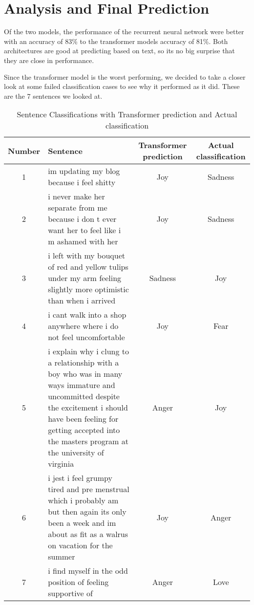 \section{Analysis and Final Prediction}
Of the two models, the performance of the recurrent neural network were better with an accuracy of 83\% to the transformer models accuracy of 81\%. Both architectures are good at predicting based on text, so its no big surprise that they are close in performance. 

Since the transformer model is the worst performing, we decided to take a closer look at some failed classification cases to see why it performed as it did. These are the 7 sentences we looked at.

\begin{table}[H]
    \centering
    \renewcommand{\arraystretch}{1.5} %
    \setlength{\tabcolsep}{8pt} %
    
    \begin{tabular}{|c|p{8cm}|c|c|}
    \hline 
    \textbf{Number} & \textbf{Sentence} & \textbf{Transformer prediction} & \textbf{Actual classification} \\ \hline
    1 & im updating my blog because i feel shitty & Joy & Sadness \\ \hline
    2 & i never make her separate from me because i don t ever want her to feel like i m ashamed with her & Joy & Sadness \\ \hline
    3 & i left with my bouquet of red and yellow tulips under my arm feeling slightly more optimistic than when i arrived & Sadness & Joy \\ \hline
    4 & i cant walk into a shop anywhere where i do not feel uncomfortable & Joy & Fear \\ \hline
    5 & i explain why i clung to a relationship with a boy who was in many ways immature and uncommitted despite the excitement i should have been feeling for getting accepted into the masters program at the university of virginia & Anger & Joy \\ \hline
    6 & i jest i feel grumpy tired and pre menstrual which i probably am but then again its only been a week and im about as fit as a walrus on vacation for the summer & Joy & Anger \\ \hline
    7 & i find myself in the odd position of feeling supportive of & Anger & Love \\ \hline
    \end{tabular}
    \caption{Sentence Classifications with Transformer prediction and Actual classification}
    \label{tab:sentence_classifications}
    \end{table}


